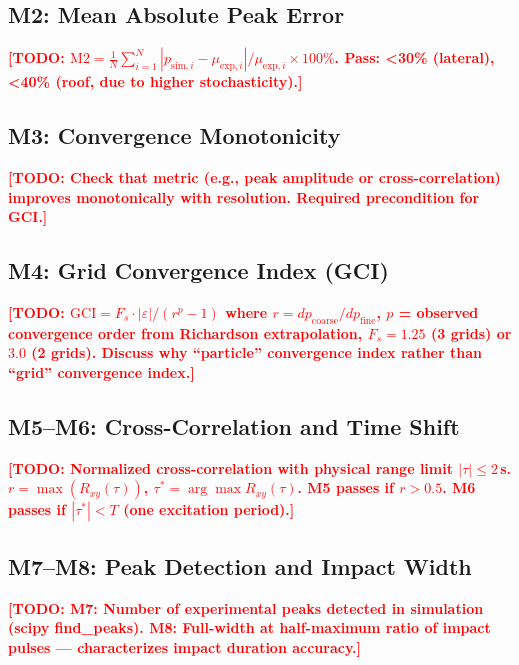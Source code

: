 \documentclass[twocolumn]{svjour3}
\newcommand{\TODO}[1]{\textcolor{red}{\textbf{[TODO: #1]}}}
\begin{document}
\subsection{M2: Mean Absolute Peak Error}
\label{sec:m2}

\TODO{$\text{M2} = \frac{1}{N}\sum_{i=1}^{N} |p_{\text{sim},i} - \mu_{\text{exp},i}| / \mu_{\text{exp},i} \times 100\%$.
Pass: <30\% (lateral), <40\% (roof, due to higher stochasticity).}

\subsection{M3: Convergence Monotonicity}
\label{sec:m3}

\TODO{Check that metric (e.g., peak amplitude or cross-correlation) improves
monotonically with resolution. Required precondition for GCI.}

\subsection{M4: Grid Convergence Index (GCI)}
\label{sec:m4}

\TODO{$\text{GCI} = F_s \cdot |\varepsilon| / (r^p - 1)$ where
$r = dp_{\text{coarse}} / dp_{\text{fine}}$, $p$ = observed convergence order
from Richardson extrapolation, $F_s = 1.25$ (3 grids) or $3.0$ (2 grids).
Discuss why ``particle'' convergence index rather than ``grid'' convergence index.}

\subsection{M5--M6: Cross-Correlation and Time Shift}
\label{sec:m5-m6}

\TODO{Normalized cross-correlation with physical range limit $|\tau| \leq 2$\,s.
$r = \max(R_{xy}(\tau))$, $\tau^* = \arg\max R_{xy}(\tau)$.
M5 passes if $r > 0.5$. M6 passes if $|\tau^*| < T$ (one excitation period).}

\subsection{M7--M8: Peak Detection and Impact Width}
\label{sec:m7-m8}

\TODO{M7: Number of experimental peaks detected in simulation (scipy find\_peaks).
M8: Full-width at half-maximum ratio of impact pulses --- characterizes
impact duration accuracy.}


\end{document}
